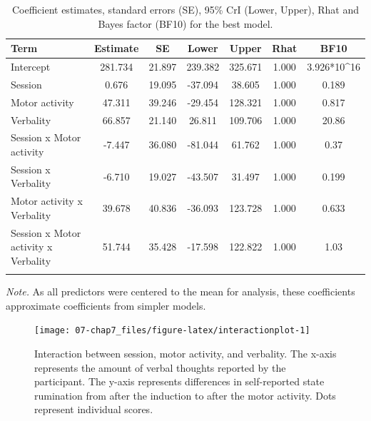 \documentclass[a4paper,12pt,twoside,openright,oldfontcommands,final]{memoir}
\begin{document}
\begin{table}[H]
\begin{center}
\begin{threeparttable}
\caption{\label{tab:paramexp2}Coefficient estimates, standard errors (SE), 95\% CrI (Lower, Upper), Rhat and Bayes factor (BF10) for the best model.}
\small{
\begin{tabular}{lcccccc}
\toprule
Term & \multicolumn{1}{c}{Estimate} & \multicolumn{1}{c}{SE} & \multicolumn{1}{c}{Lower} & \multicolumn{1}{c}{Upper} & \multicolumn{1}{c}{Rhat} & \multicolumn{1}{c}{BF10}\\
\midrule
Intercept & 281.734 & 21.897 & 239.382 & 325.671 & 1.000 & 3.926*10\textasciicircum{}16\\
Session & 0.676 & 19.095 & -37.094 & 38.605 & 1.000 & 0.189\\
Motor activity & 47.311 & 39.246 & -29.454 & 128.321 & 1.000 & 0.817\\
Verbality & 66.857 & 21.140 & 26.811 & 109.706 & 1.000 & 20.86\\
Session x Motor activity & -7.447 & 36.080 & -81.044 & 61.762 & 1.000 & 0.37\\
Session x Verbality & -6.710 & 19.027 & -43.507 & 31.497 & 1.000 & 0.199\\
Motor activity x Verbality & 39.678 & 40.836 & -36.093 & 123.728 & 1.000 & 0.633\\
Session x Motor activity x Verbality & 51.744 & 35.428 & -17.598 & 122.822 & 1.000 & 1.03\\
\bottomrule
\addlinespace
\end{tabular}
}
\begin{tablenotes}[para]
\textit{Note.} As all predictors were centered to the mean for analysis, these coefficients approximate coefficients from simpler models.
\end{tablenotes}
\end{threeparttable}
\end{center}
\end{table}

\begin{figure}

{\centering \texttt{[image: 07-chap7\_files/figure-latex/interactionplot-1]} 

}

\caption{Interaction between session, motor activity, and verbality. The x-axis represents the amount of verbal thoughts reported by the participant. The y-axis represents differences in self-reported state rumination from after the induction to after the motor activity. Dots represent individual scores.}\label{fig:interactionplot}
\end{figure}
\end{document}
